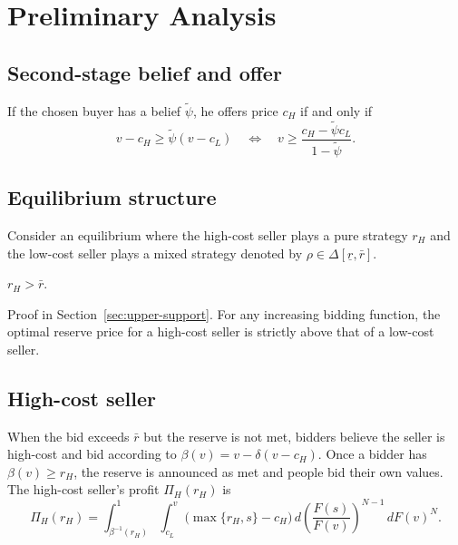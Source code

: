 \section{Preliminary Analysis}
\label{sec:preliminary}

\subsection{Second-stage belief and offer}
\label{subsec:second-stage}

If the chosen buyer has a belief $\tilde{\psi}$, he offers price $c_H$ if and
only if
\begin{equation}
  v - c_H \ge \tilde{\psi}(v - c_L)
  \quad\Longleftrightarrow\quad
  v \ge \frac{c_H - \tilde{\psi} c_L}{1 - \tilde{\psi}}.
  \label{eq:second-stage-threshold}
\end{equation}

\subsection{Equilibrium structure}
\label{subsec:eqm-structure}

Consider an equilibrium where the high-cost seller plays a pure strategy $r_H$
and the low-cost seller plays a mixed strategy denoted by
$\rho \in \Delta[\underline{r}, \bar{r}]$.

\begin{claim}
  \label{claim:rH-bar}
  $r_H > \bar{r}$.
\end{claim}
\noindent
Proof in Section~\ref{sec:upper-support}.
For any increasing bidding function, the optimal reserve price for a high-cost
seller is strictly above that of a low-cost seller.

\subsection{High-cost seller}
\label{subsec:high-cost-prelim}

When the bid exceeds $\bar{r}$ but the reserve is not met, bidders believe the
seller is high-cost and bid according to $\beta(v) = v - \delta(v - c_H)$.
Once a bidder has $\beta(v) \ge r_H$, the reserve is announced as met and
people bid their own values. The high-cost seller's profit $\Pi_H(r_H)$ is
\begin{equation}
  \Pi_H(r_H)
  = \int_{\beta^{-1}(r_H)}^{1}
    \int_{c_L}^{v}
      \bigl(\max\{r_H, s\} - c_H\bigr)
      \, d\!\left(\frac{F(s)}{F(v)}\right)^{N-1}
    \, dF(v)^{N}.
  \label{eq:Pi-H-integral}
\end{equation}


